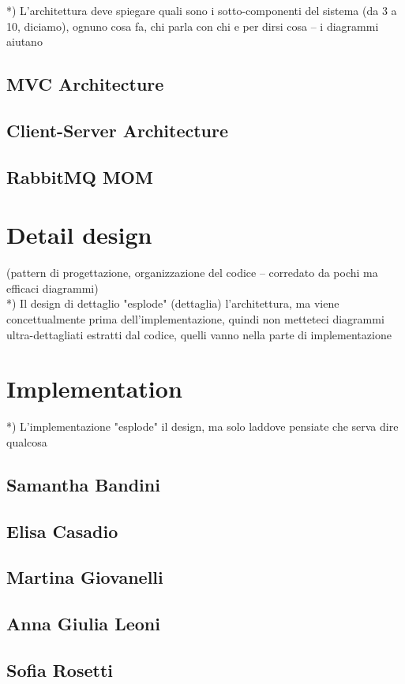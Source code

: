 \documentclass[a4paper,12pt]{report}
\begin{document}
*) L'architettura deve spiegare quali sono i sotto-componenti del sistema (da 3 a 10, diciamo), ognuno cosa fa, chi parla con chi e per dirsi cosa -- i diagrammi aiutano\\

\section{MVC Architecture}
\section{Client-Server Architecture}
\section{RabbitMQ MOM}

\chapter{Detail design}
(pattern di progettazione, organizzazione del codice -- corredato da pochi ma efficaci diagrammi)\\
*) Il design di dettaglio "esplode" (dettaglia) l'architettura, ma viene concettualmente prima dell'implementazione, quindi non metteteci diagrammi ultra-dettagliati estratti dal codice, quelli vanno nella parte di implementazione

\chapter{Implementation}

*) L'implementazione "esplode" il design, ma solo laddove pensiate che serva dire qualcosa

\section{Samantha Bandini}
\section{Elisa Casadio}
\section{Martina Giovanelli}
\section{Anna Giulia Leoni}
\section{Sofia Rosetti}
\end{document}
